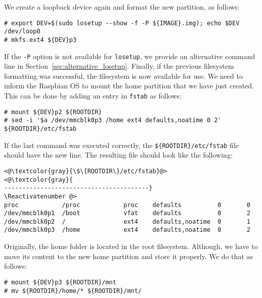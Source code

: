 We create a loopback device again and format the new partition, as follows:
\begin{lstlisting}[]
# export DEV=$(sudo losetup --show -f -P ${IMAGE}.img); echo $DEV
/dev/loop0
# mkfs.ext4 ${DEV}p3
\end{lstlisting}
\FloatBarrier
\vspace{-5mm}

If the \texttt{-P} option is not available for
\texttt{losetup}, we provide an alternative command line in
Section~\ref{sec:alternative_losetup}. Finally, if the previous filesystem
formatting was successful, the filesystem is now available for use.
We need to inform the Raspbian \ac{OS} to mount the home partition
that we have just created.
This can be done by adding
an entry in \texttt{fstab} as follows:

\begin{lstlisting}[]
# mount ${DEV}p2 ${ROOTDIR}
# sed -i '$a /dev/mmcblk0p3 /home ext4 defaults,noatime 0 2' ${ROOTDIR}/etc/fstab
\end{lstlisting}
\FloatBarrier
\vspace{-5mm}

If the last command was executed correctly, the
\texttt{\$\{ROOTDIR\}/etc/fstab} file should have the new line.
The resulting file should look like the following:

\begin{lstlisting}[]
<@\textcolor{gray}{\$\{ROOTDIR\}/etc/fstab}@>
<@\textcolor{gray}{
----------------------------------------}
\Reactivatenumber @>
proc            /proc            proc    defaults          0       0
/dev/mmcblk0p1  /boot            vfat    defaults          0       2
/dev/mmcblk0p2  /                ext4    defaults,noatime  0       1
/dev/mmcblk0p3  /home            ext4    defaults,noatime  0       2
\end{lstlisting}
\FloatBarrier
\vspace{-5mm}

Originally, the home folder is located in the root filesystem. Although,
we have to move its content to the new home partition and store it properly.
We do that as follows:

\begin{lstlisting}[]
# mount ${DEV}p3 ${ROOTDIR}/mnt
# mv ${ROOTDIR}/home/* ${ROOTDIR}/mnt/
\end{lstlisting}
\FloatBarrier
\vspace{-5mm}

